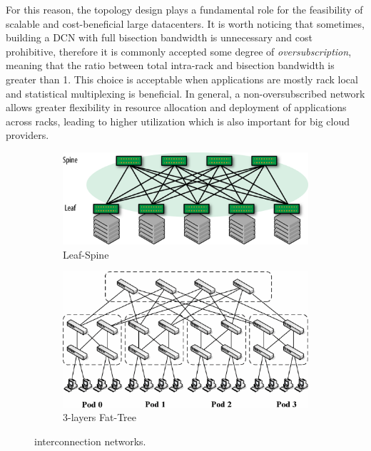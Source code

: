 For this reason, the topology design plays a fundamental role for the feasibility of scalable and cost-beneficial large datacenters. It is worth noticing that sometimes, building a DCN with full bisection bandwidth is unnecessary and cost prohibitive, therefore it is commonly accepted some degree of \textit{oversubscription}, meaning that the ratio between total intra-rack and bisection bandwidth is greater than 1. This choice is acceptable when applications are mostly rack local and statistical multiplexing is beneficial. In general, a non-oversubscribed network allows greater flexibility in resource allocation and deployment of applications across racks, leading to higher utilization which is also important for big cloud providers.
\begin{figure}
	\centering
	\begin{subfigure}[b]{0.45\textwidth}
		\centering
		\includegraphics[width=\textwidth]{Chapter1/Figures/leaf-spine}
		\caption{Leaf-Spine}
		\label{fig:leafspine}
	\end{subfigure}
	\hfill
	\begin{subfigure}[b]{0.45\textwidth}
		\centering
		\includegraphics[width=\textwidth]{Chapter1/Figures/fat-tree}
		\caption{3-layers Fat-Tree}
		\label{fig:fattree}
	\end{subfigure}
	\caption{interconnection networks.}
	\label{fig:topology}
\end{figure}


